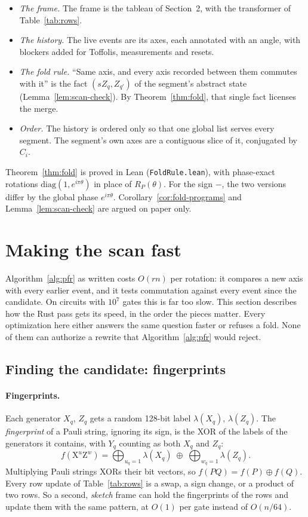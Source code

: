\documentclass[11pt]{article}
\theoremstyle{definition}
\theoremstyle{remark}
\newcommand{\tX}{\mathrm{X}}
\newcommand{\tZ}{\mathrm{Z}}
\begin{document}
\begin{itemize}[nosep]
  \item \emph{The frame.} The frame is the tableau of Section~2, with the transformer
  of Table~\ref{tab:rows}.
  \item \emph{The history.} The live events are its axes, each annotated with an angle, with
  blockers added for Toffolis, measurements and resets.
  \item \emph{The fold rule.} ``Same axis, and every axis recorded between them commutes
  with it'' is the fact $(s Z_q, Z_{q'})$ of the segment's abstract state
  (Lemma~\ref{lem:scan-check}). By Theorem~\ref{thm:fold}, that single fact licenses the
  merge.
  \item \emph{Order.} The history is ordered only so that one global list serves every
  segment. The segment's own axes are a contiguous slice of it, conjugated by $C_i$.
\end{itemize}
Theorem~\ref{thm:fold} is proved in Lean (\texttt{FoldRule.lean}), with phase-exact
rotations $\mathrm{diag}(1, e^{i\pi\theta})$ in place of $R_P(\theta)$. For the sign $-$,
the two versions differ by the global phase $e^{i\pi\theta}$. Corollary~\ref{cor:fold-programs}
and Lemma~\ref{lem:scan-check} are argued on paper only.

\section{Making the scan fast}\label{sec:fast}

Algorithm~\ref{alg:pfr} as written costs $O(rn)$ per rotation: it compares a new axis with
every earlier event, and it tests commutation against every event since the candidate. On
circuits with $10^7$ gates this is far too slow. This section describes how the Rust pass
gets its speed, in the order the pieces matter. Every optimization here either answers the
same question faster or refuses a fold. None of them can authorize a rewrite that
Algorithm~\ref{alg:pfr} would reject.

\subsection{Finding the candidate: fingerprints}

\paragraph{Fingerprints.}
Each generator $X_q$, $Z_q$ gets a random 128-bit label $\lambda(X_q)$, $\lambda(Z_q)$. The
\emph{fingerprint} of a Pauli string, ignoring its sign, is the XOR of the labels of the
generators it contains, with $Y_q$ counting as both $X_q$ and $Z_q$:
\[
  f(\tX^u \tZ^w) = \bigoplus_{u_q = 1} \lambda(X_q) \;\oplus\; \bigoplus_{w_q = 1} \lambda(Z_q).
\]
Multiplying Pauli strings XORs their bit vectors, so $f(PQ) = f(P) \oplus f(Q)$. Every row
update of Table~\ref{tab:rows} is a swap, a sign change, or a product of two rows. So a
second, \emph{sketch} frame can hold the fingerprints of the rows and update them with the
same pattern, at $O(1)$ per gate instead of $O(n/64)$.
\end{document}
